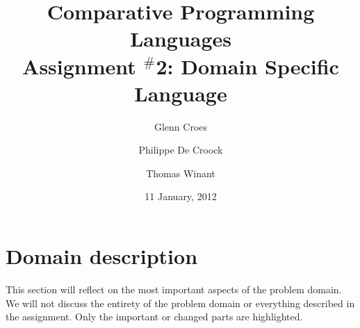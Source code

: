 \documentclass[a4paper]{article}
\begin{document}

\title{Comparative Programming Languages\\
Assignment $^{\#}$2: Domain Specific Language}
\author{Glenn Croes \and Philippe De Croock \and Thomas Winant}
\date{11 January, 2012}

\maketitle

\tableofcontents

\clearpage
\section{Domain description}
\label{sec:domain-description}




This section will reflect on the most important aspects of the problem domain.
We will not discuss the entirety of the problem domain or everything described in the assignment.
Only the important or changed parts are highlighted.
\end{document}
